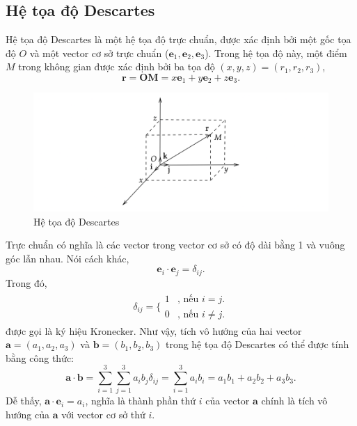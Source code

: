 \subsection{Hệ tọa độ Descartes}
\begin{definition}
    Hệ tọa độ Descartes là một hệ tọa độ trực chuẩn, được xác định bởi một gốc tọa độ \(O\) và một vector cơ sở trực chuẩn (\(\mathbf{e}_1, \mathbf{e}_2, \mathbf{e}_3\)). Trong hệ tọa độ này, một điểm \(M\) trong không gian được xác định bởi ba tọa độ \((x, y, z)=(r_1, r_2, r_3)\),
    \begin{equation}
        \mathbf{r}=\mathbf{OM} = x\mathbf{e}_1 + y\mathbf{e}_2 + z\mathbf{e}_3.
    \end{equation}
\end{definition}
\begin{figure}[H]
    \centering
    \includegraphics[width=1\textwidth]{Tuan2/Figures/toadodescartes.png}
    \caption{Hệ tọa độ Descartes}
\end{figure}
Trực chuẩn có nghĩa là các vector trong vector cơ sở có độ dài bằng 1 và vuông góc lẫn nhau. Nói cách khác, 
\begin{equation}
    \mathbf{e}_i \cdot \mathbf{e}_j =\delta_{ij}.
\end{equation}
Trong đó, \begin{equation*}
\begin{array}{l}
     \delta_{ij}=\Bigg\{
    \begin{array}{ll}
      1  & \text{, nếu } i=j. \\
      0  & \text{, nếu } i\neq j.
    \end{array}
\end{array}
\end{equation*} được gọi là ký hiệu Kronecker. Như vậy, tích vô hướng của hai vector \(\mathbf{a}=(a_1, a_2, a_3)\) và \(\mathbf{b}=(b_1,b_2,b_3)\) trong hệ tọa độ Descartes có thể được tính bằng công thức:
\begin{equation}
    \mathbf{a}\cdot\mathbf{b}= \sum_{i=1}^{3}\sum_{j=1}^{3}a_i b_j \delta_{ij}= \sum_{i=1}^{3} a_i b_i = a_1 b_1 + a_2 b_2 + a_3 b_3.
\end{equation} Dễ thấy, \(\mathbf{a} \cdot \mathbf{e}_i =a_i\), nghĩa là thành phần thứ \(i\) của vector \(\mathbf{a}\) chính là tích vô hướng của \(\mathbf{a}\) với vector cơ sở thứ \(i\).
